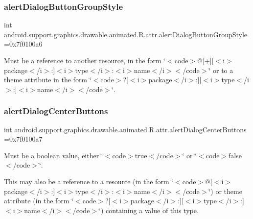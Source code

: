\subsubsection{\texorpdfstring{alert\+Dialog\+Button\+Group\+Style}{alertDialogButtonGroupStyle}}
{\footnotesize\ttfamily int android.\+support.\+graphics.\+drawable.\+animated.\+R.\+attr.\+alert\+Dialog\+Button\+Group\+Style =0x7f0100a6\hspace{0.3cm}{\ttfamily [static]}}

Must be a reference to another resource, in the form \char`\"{}$<$code$>$@\mbox{[}+\mbox{]}\mbox{[}$<$i$>$package$<$/i$>$\+:\mbox{]}$<$i$>$type$<$/i$>$\+:$<$i$>$name$<$/i$>$$<$/code$>$\char`\"{} or to a theme attribute in the form \char`\"{}$<$code$>$?\mbox{[}$<$i$>$package$<$/i$>$\+:\mbox{]}\mbox{[}$<$i$>$type$<$/i$>$\+:\mbox{]}$<$i$>$name$<$/i$>$$<$/code$>$\char`\"{}. \mbox{\label{classandroid_1_1support_1_1graphics_1_1drawable_1_1animated_1_1R_1_1attr_aa693060a1e30b20ee838da5e834a7225}} 
\subsubsection{\texorpdfstring{alert\+Dialog\+Center\+Buttons}{alertDialogCenterButtons}}
{\footnotesize\ttfamily int android.\+support.\+graphics.\+drawable.\+animated.\+R.\+attr.\+alert\+Dialog\+Center\+Buttons =0x7f0100a7\hspace{0.3cm}{\ttfamily [static]}}

Must be a boolean value, either \char`\"{}$<$code$>$true$<$/code$>$\char`\"{} or \char`\"{}$<$code$>$false$<$/code$>$\char`\"{}. 

This may also be a reference to a resource (in the form \char`\"{}$<$code$>$@\mbox{[}$<$i$>$package$<$/i$>$\+:\mbox{]}$<$i$>$type$<$/i$>$\+:$<$i$>$name$<$/i$>$$<$/code$>$\char`\"{}) or theme attribute (in the form \char`\"{}$<$code$>$?\mbox{[}$<$i$>$package$<$/i$>$\+:\mbox{]}\mbox{[}$<$i$>$type$<$/i$>$\+:\mbox{]}$<$i$>$name$<$/i$>$$<$/code$>$\char`\"{}) containing a value of this type. \mbox{\label{classandroid_1_1support_1_1graphics_1_1drawable_1_1animated_1_1R_1_1attr_a61a87c46a083accae6f01e050d6b23d1}} 
